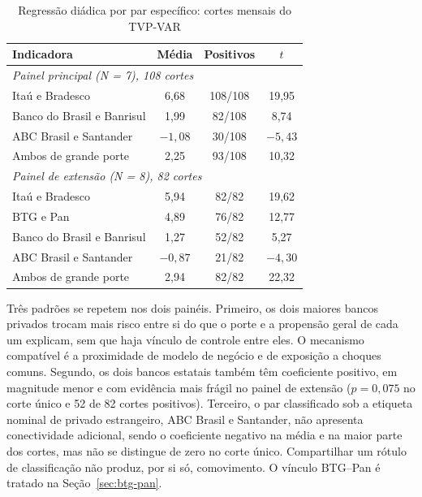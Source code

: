 \begin{table}[!htbp]
\centering
\caption{Regressão diádica por par específico: cortes mensais do TVP-VAR}
\label{tab:diadica-temporal}
\small
\begin{tabular}{lccc}
\toprule
Indicadora & Média & Positivos & $t$ \\
\midrule
\multicolumn{4}{l}{\textit{Painel principal (N = 7), 108 cortes}} \\
Itaú e Bradesco            & 6,68 & 108/108 & 19,95 \\
Banco do Brasil e Banrisul & 1,99 &  82/108 &  8,74 \\
ABC Brasil e Santander     & $-1{,}08$ & 30/108 & $-5{,}43$ \\
Ambos de grande porte      & 2,25 &  93/108 & 10,32 \\
\midrule
\multicolumn{4}{l}{\textit{Painel de extensão (N = 8), 82 cortes}} \\
Itaú e Bradesco            & 5,94 &  82/82 & 19,62 \\
BTG e Pan                  & 4,89 &  76/82 & 12,77 \\
Banco do Brasil e Banrisul & 1,27 &  52/82 &  5,27 \\
ABC Brasil e Santander     & $-0{,}87$ & 21/82 & $-4{,}30$ \\
Ambos de grande porte      & 2,94 &  82/82 & 22,32 \\
\bottomrule
\end{tabular}
\end{table}

Três padrões se repetem nos dois painéis. Primeiro, os dois maiores bancos
privados trocam mais risco entre si do que o porte e a propensão geral de cada um
explicam, sem que haja vínculo de controle entre eles. O mecanismo compatível é a
proximidade de modelo de negócio e de exposição a choques comuns. Segundo, os dois
bancos estatais também têm coeficiente positivo, em magnitude menor e com
evidência mais frágil no painel de extensão ($p=0{,}075$ no corte único e 52 de 82
cortes positivos). Terceiro, o par classificado sob a etiqueta nominal de privado
estrangeiro, ABC Brasil e Santander, não apresenta conectividade adicional, sendo o
coeficiente negativo na média e na maior parte dos cortes, mas não se distingue
de zero no corte único. Compartilhar um rótulo de classificação não produz, por si só,
comovimento. O vínculo BTG--Pan é tratado na Seção~\ref{sec:btg-pan}.

